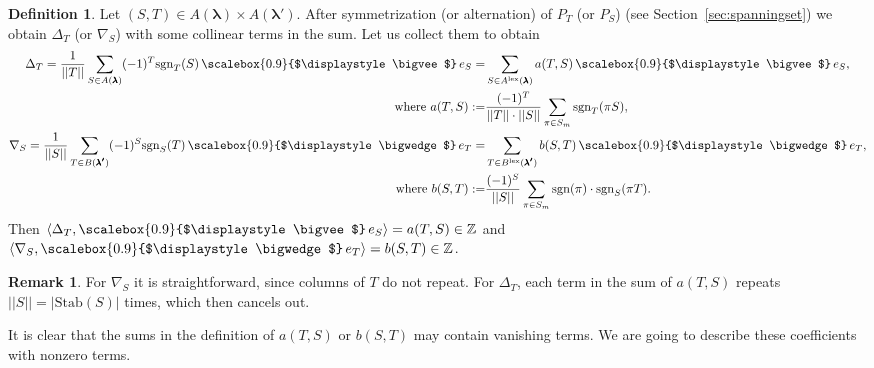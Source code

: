 \documentclass[12pt, reqno]{amsart}
\theoremstyle{definition}
\newtheorem{definition}[theorem]{Definition}
\newtheorem{remark}{Remark}[section]
\newcommand{\sgn}{\mathrm{sgn}}
\let\oldbigwedge\bigwedge
\let\oldbigvee\bigvee
\renewcommand{\bigwedge}{
  \mathop{
    \vcenter{
      \hbox{\scalebox{0.9}{$\displaystyle\oldbigwedge$}}
    }
  }
}
\renewcommand{\bigvee}{
  \mathop{
    \vcenter{
      \hbox{\scalebox{0.9}{$\displaystyle\oldbigvee$}}
    }
  }
}
\begin{document}
\begin{definition}
    Let $(S,T) \in A(\pmb{\lambda}) \times A(\pmb{\lambda'})$. After symmetrization (or alternation) of $P_T$ (or $P_S$) (see Section~\ref{sec:spanningset}) we obtain $\Delta_T$ (or $\nabla_S$) with some collinear terms in the sum. Let us collect them to obtain
    \begin{align*}
        \Delta_T = \frac{1}{||T||}\sum_{S \in A(\pmb{\lambda})}(-1)^T\sgn_T(S) \bigvee e_{S}
        =& \sum_{S \in A^{\mathrm{lex}}(\pmb{\lambda})} a(T,S) \bigvee e_S,
        \\
        \qquad\text{where } a(T,S) :=& \frac{(-1)^{T}}{||T||\cdot||S||}\sum_{\pi \in S_m} \sgn_T(\pi S),
        \\
        \nabla_S = \frac{1}{||S||}
        \sum_{T \in B(\pmb{\lambda'})}
            (-1)^S \sgn_S(T) \bigwedge e_{T}
        =& \sum_{T \in B^{\mathrm{lex}}(\pmb{\lambda'})} b(S,T) \bigwedge e_T,
        \\
        \text{where } b(S,T) :=& \frac{(-1)^S}{||S||}  \sum_{\pi \in S_m} \sgn(\pi) \cdot \sgn_S(\pi T).
    \end{align*}
    Then $\langle\Delta_T, \bigvee e_S\rangle = a(T,S)\in \mathbb{Z}$ and $\langle\nabla_S, \bigwedge e_T\rangle = b(S,T) \in \mathbb{Z}$.
\end{definition}

\begin{remark}
    For $\nabla_S$ it is straightforward, since columns of $T$ do not repeat. For $\Delta_T$, each term in the sum of $a(T,S)$ repeats $||S||=|\mathrm{Stab}(S)|$ times, which then cancels out.
\end{remark}

It is clear that the sums in the definition of $a(T,S)$ or $b(S,T)$ may contain vanishing terms. We are going to describe these coefficients with nonzero terms. 
\end{document}
